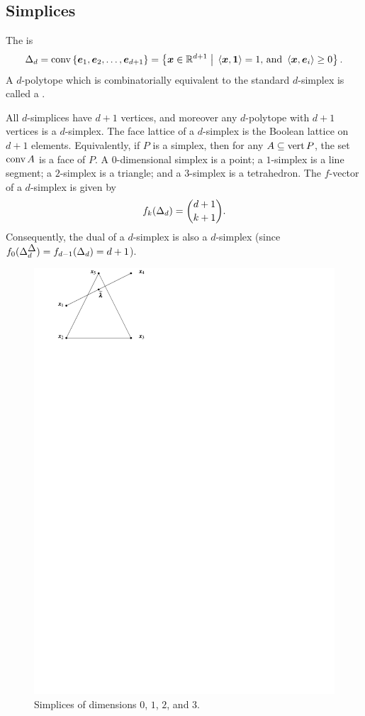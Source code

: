     \subsection{Simplices}

    The  is
        \[
            \simp d
                =   \conv\seta{\ve e_1,\ve e_2\dc\ve e_{d+1}}
                =   \setb{\ve x\in\R{d+1}}{\ip{\ve x}{\ve 1}=1\text{, and } \ip{\ve x}{\ve e_i}\ge0}.
        \]
    A \(d\)-polytope which is combinatorially equivalent to the standard \(d\)-simplex is called a .

    All \(d\)-simplices have \(d+1\) vertices, and moreover any \(d\)-polytope with \(d+1\) vertices is a \(d\)-simplex.  The face lattice of a \(d\)-simplex is the Boolean lattice on \(d+1\) elements.  Equivalently, if \(P\) is a simplex, then for any \(A\subseteq\operatorname{vert} P\), the set \(\operatorname{conv} A\) is a face of \(P\).  A \(0\)-dimensional simplex is a point; a \(1\)-simplex is a line segment; a \(2\)-simplex is a triangle; and a \(3\)-simplex is a tetrahedron.  The \(f\)-vector of a \(d\)-simplex is given by
        \[
            f_k(\Delta_{d})
                =   \binom{d+1}{k+1}.
        \]
    Consequently, the dual of a \(d\)-simplex is also a \(d\)-simplex (since \(f_{0}(\simp d^{\tri})=f_{d-1}(\simp d)=d+1\)).

    \begin{center}
        \begin{figure}[h!b]
            \includegraphics[page=4, width=.8\textwidth]{pictures.pdf}
            \caption{Simplices of dimensions $0$, $1$, $2$, and $3$.}
        \end{figure}
    \end{center}
